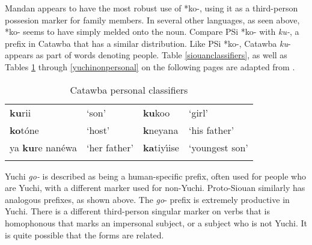 \documentclass[output=paper]{LSP/langsci}
\begin{document}
Mandan appears to have the most robust use of *ko-, using it as a third-person possesion marker for family members. In several other languages, as seen above, *ko- seems to have simply melded onto the noun. Compare PSi *ko- with \emph{ku-}, a prefix in Catawba that has a similar distribution. Like PSi *ko-, Catawba \emph{ku}- appears as part of words denoting people. Table \ref{siouanclassifiers}, as well as Tables \ref{catawbaclassifiers} through \ref{yuchinonpersonal} on the following pages are adapted from \citet{Rankin1998}.

\begin{table}  
\caption{Catawba personal classifiers} \label{catawbaclassifiers}
    \begin{tabularx}{.75\textwidth}{XXXX}\lsptoprule
        \textbf{ku}rii & `son' & \textbf{ku}koo & `girl' \\ 
        \textbf{ko}t\'one & `host' & \textbf{k\textipa{@}}neyana & `his father' \\ 
			{ya \textbf{ku}re nan\'ewa} & `her father' & {\textbf{ka}tiy\'\i ise} & `youngest son' \\
\lspbottomrule
    \end{tabularx} 
\end{table}

\begin{table} 

\end{table}

Yuchi \textit{go-} is described as being a human-specific prefix, often used for people who are Yuchi, with a different marker used for non-Yuchi. Proto-Siouan similarly has analogous prefixes, as shown above. The \emph{go}- prefix is extremely productive in Yuchi. There is a different third-person singular marker on verbs that is homophonous that marks an impersonal subject, or a subject who is not Yuchi. It is quite possible that the forms are related.
\end{document}
